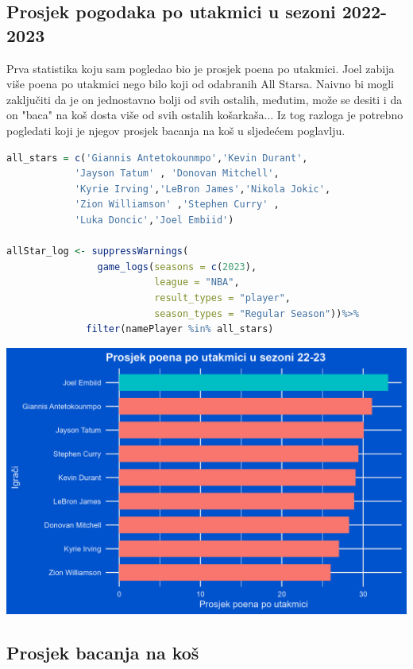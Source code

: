 \documentclass[letterpaper,11pt,leqno]{article}
\begin{document}
\subsection{Prosjek pogodaka po utakmici u sezoni 2022-2023} 

Prva statistika koju sam pogledao bio je prosjek poena po utakmici. Joel zabija više poena po utakmici nego bilo koji od odabranih All Starsa. Naivno bi mogli zaključiti da je on jednostavno bolji od svih ostalih, međutim, može se desiti i da on "baca" na koš dosta više od svih ostalih košarkaša... Iz tog razloga je potrebno pogledati koji je njegov prosjek bacanja na koš u sljedećem poglavlju.

\begin{lstlisting}[language=R]
all_stars = c('Giannis Antetokounmpo','Kevin Durant', 
            'Jayson Tatum' , 'Donovan Mitchell',
            'Kyrie Irving','LeBron James','Nikola Jokic',   
            'Zion Williamson' ,'Stephen Curry' , 
            'Luka Doncic','Joel Embiid')  

allStar_log <- suppressWarnings(
                game_logs(seasons = c(2023),
                          league = "NBA", 
                          result_types = "player", 
                          season_types = "Regular Season"))%>% 
              filter(namePlayer %in% all_stars)
\end{lstlisting}

\begin{center}
    \includegraphics[scale=0.9]{ProsjekPoena22-23.png}
\end{center}

\subsection{Prosjek bacanja na koš}
\end{document}
